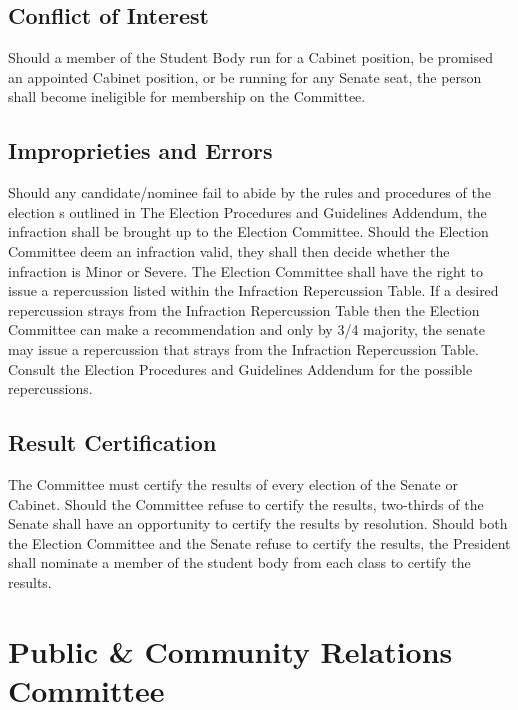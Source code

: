 \documentclass[12pt]{scrreprt}
\begin{document}
\subsection{Conflict of Interest}
Should a member of the Student Body run for a Cabinet position, be promised an 
appointed Cabinet position, or be running for any Senate seat, the person 
shall become ineligible for membership on the Committee.

\subsection{Improprieties and Errors}
Should any candidate/nominee fail to abide by the rules and procedures of the
election s outlined in The Election Procedures and Guidelines Addendum, the infraction shall be brought up to the Election Committee. Should the Election Committee deem an infraction valid, they shall then decide whether the infraction is Minor or Severe. The Election Committee shall have the right to issue a repercussion listed within the Infraction Repercussion Table. If a desired repercussion strays from the Infraction Repercussion Table then the Election Committee can make a recommendation and only by 3/4 majority, the senate may issue a repercussion that strays from the Infraction Repercussion Table. Consult the Election Procedures and Guidelines Addendum for the possible repercussions. 

\subsection{Result Certification}
The Committee must certify the results of every election of the Senate or 
Cabinet. Should the Committee refuse to certify the results, two-thirds of the 
Senate shall have an opportunity to certify the results by resolution. Should both the Election Committee and the Senate refuse to certify the results, the President shall nominate a member of the student body from each class to certify
the results. 

\section{Public \& Community Relations Committee}
\end{document}
